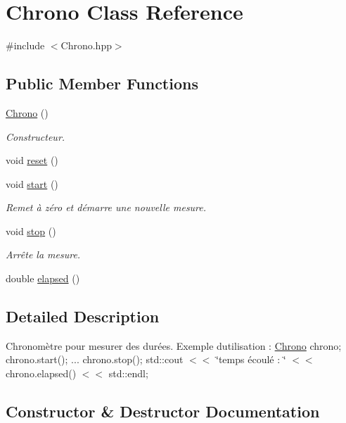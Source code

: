 \hypertarget{classChrono}{}\section{Chrono Class Reference}
\label{classChrono}


{\ttfamily \#include $<$Chrono.\+hpp$>$}

\subsection*{Public Member Functions}
\begin{DoxyCompactItemize}
\item 
\hyperlink{classChrono_a3ac5e047174f389e7bd8aae71c6b5e8c}{Chrono} ()
\begin{DoxyCompactList}\small\item\em Constructeur. \end{DoxyCompactList}\item 
void \hyperlink{classChrono_a027be23720616639bc610a98c53740ea}{reset} ()
\item 
void \hyperlink{classChrono_a25fa21b48125a6a811638aa6b8dcdbe8}{start} ()
\begin{DoxyCompactList}\small\item\em Remet à zéro et démarre une nouvelle mesure. \end{DoxyCompactList}\item 
void \hyperlink{classChrono_a7b8db2281381eac23da35a414077f3fd}{stop} ()
\begin{DoxyCompactList}\small\item\em Arrête la mesure. \end{DoxyCompactList}\item 
double \hyperlink{classChrono_aad4b00919a2eed1271259095a61b3096}{elapsed} ()
\end{DoxyCompactItemize}


\subsection{Detailed Description}
Chronomètre pour mesurer des durées. Exemple d\textquotesingle{}utilisation \+: \hyperlink{classChrono}{Chrono} chrono; chrono.\+start(); ... chrono.\+stop(); std\+::cout $<$$<$ \char`\"{}temps écoulé \+: \char`\"{} $<$$<$ chrono.\+elapsed() $<$$<$ std\+::endl; 

\subsection{Constructor \& Destructor Documentation}
